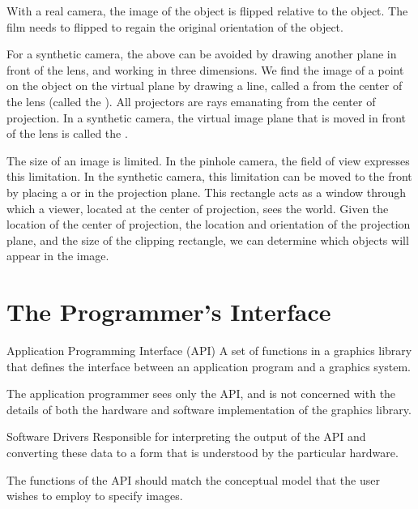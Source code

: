 \documentclass[\main/notes.tex]{subfiles}
\begin{document}
			With a real camera, the image of the object is flipped relative to the object.
			The film needs to flipped to regain the original orientation of the object.

			For a synthetic camera, the above can be avoided by
			drawing another plane in front of the lens, and
			working in three dimensions.
			We find the image of a point on the object on the virtual plane
			by drawing a line, called a 
			from the center of the lens (called the ).
			All projectors are rays emanating from the center of projection.
			In a synthetic camera, the virtual image plane that is moved in front of the lens
			is called the .

			The size of an image is limited.
			In the pinhole camera, the field of view expresses this limitation.
			In the synthetic camera, this limitation can be moved to the front by
			placing a  or 
			in the projection plane.
			This rectangle acts as a window through which a viewer,
			located at the center of projection,
			sees the world.
			Given the location of the center of projection,
			the location and orientation of the projection plane, and
			the size of the clipping rectangle,
			we can determine which objects will appear in the image.

		\pagebreak

		\section{The Programmer's Interface}
			\begin{definition}{Application Programming Interface (API)}
				A set of functions in a graphics library that defines the interface
				between an application program and a graphics system.
			\end{definition}

			The application programmer sees only the API,
			and is not concerned with the details of both the hardware and software implementation
			of the graphics library.

			\begin{definition}{Software Drivers}
				Responsible for interpreting the output of the API
				and converting these data to a form that is understood by the particular hardware.
			\end{definition}

			The functions of the API should match the conceptual model
			that the user wishes to employ to specify images.
\end{document}
